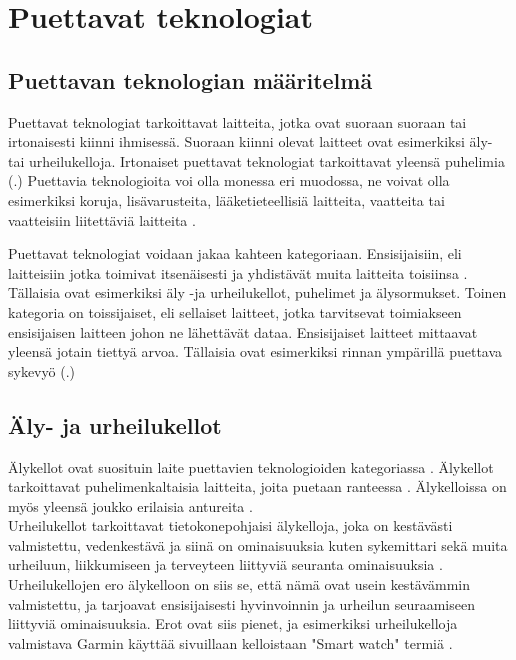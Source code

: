 \documentclass[utf8,bachelor,finnish]{bachelor}
\begin{document}
   
\chapter{Puettavat teknologiat}

\section{Puettavan teknologian määritelmä}
  Puettavat teknologiat tarkoittavat laitteita, jotka ovat suoraan suoraan tai irtonaisesti
   kiinni ihmisessä. Suoraan kiinni olevat laitteet ovat esimerkiksi äly- tai urheilukelloja.
    Irtonaiset puettavat teknologiat tarkoittavat yleensä puhelimia (\cite{godfrey2018z}.) Puettavia teknologioita voi olla
     monessa eri muodossa, ne voivat olla esimerkiksi koruja, lisävarusteita, lääketieteellisiä laitteita, vaatteita tai
      vaatteisiin liitettäviä laitteita \parencite{Yasar_what_wearable}.
    
  Puettavat teknologiat voidaan jakaa kahteen kategoriaan. Ensisijaisiin, eli laitteisiin jotka toimivat itsenäisesti
   ja yhdistävät muita laitteita toisiinsa \parencite{godfrey2018z}. Tällaisia ovat esimerkiksi äly -ja urheilukellot, puhelimet ja älysormukset.
    Toinen kategoria on toissijaiset, eli sellaiset laitteet, jotka tarvitsevat toimiakseen ensisijaisen laitteen johon ne lähettävät dataa. 
     Ensisijaiset laitteet mittaavat yleensä jotain tiettyä arvoa. Tällaisia ovat esimerkiksi rinnan ympärillä puettava sykevyö (\cite{godfrey2018z}.) \\

  \section{Äly- ja urheilukellot}
  Älykellot ovat suosituin laite puettavien teknologioiden kategoriassa \parencite{godfrey2018z}.
   Älykellot tarkoittavat puhelimenkaltaisia laitteita, joita puetaan ranteessa \parencite{Gregersen_watch_2023}.
    Älykelloissa on myös yleensä joukko erilaisia antureita \parencite{rawassizadeh_wearables_2014}.\\

  Urheilukellot tarkoittavat tietokonepohjaisi älykelloja, joka on kestävästi valmistettu, vedenkestävä ja siinä on ominaisuuksia kuten
    sykemittari sekä muita urheiluun, liikkumiseen ja terveyteen liittyviä seuranta ominaisuuksia \parencite{sportswatch_tfd}. Urheilukellojen ero älykelloon on siis se,
     että nämä ovat usein kestävämmin valmistettu, ja tarjoavat ensisijaisesti hyvinvoinnin ja urheilun seuraamiseen liittyviä ominaisuuksia. Erot ovat siis pienet, 
      ja esimerkiksi urheilukelloja valmistava Garmin käyttää sivuillaan kelloistaan "Smart watch" termiä \parencite{garmin_site}. \\
  
\end{document}
